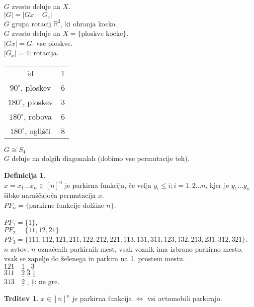 \documentclass[a4paper, 12pt]{book}
\theoremstyle{definition}
\newtheorem{defn}[counter]{Definicija}
\newtheorem{claim}[counter]{Trditev}
\theoremstyle{remark}
\newcommand{\R}{\mathbb{R}}
\begin{document}
$G$ zvesto deluje na $X$. \\
$|G| = |Gx| \cdot |G_x|$ \\
$G$ grupa rotacij $\R^3$, ki ohranja kocko. \\
$G$ zvesto deluje na $X = \{\text{ploskve kocke}\}$. \\
$|Gx| = G$: vse ploskve. \\
$|G_x| = 4$: rotacija. \\
\begin{center}
  \begin{tabular}{c | c}
    id & 1 \\
    $90^{\circ}$, ploskev & 6 \\
    $180^{\circ}$, ploskev & 3 \\
    $180^{\circ}$, robova & 6 \\
    $180^{\circ}$, oglišči & 8
  \end{tabular}
\end{center}
$G \cong S_4$ \\
$G$ deluje na dolgih diagonalah
(dobimo vse permutacije teh).
\begin{defn} \text{} \\
  $x = x_1 \dots x_n \in [n]^n$ je parkirna funkcija, če velja $y_i \leq i; i = 1, 2 \dots n$,
  kjer je $y_1 \dots y_n$ šibko naraščajoča permutacija $x$. \\
  $PF_n = \{\text{parkirne funkcije dolžine } n\}$.
\end{defn}
$PF_1 = \{1\}$, \\
$PF_2 = \{11, 12, 21\}$ \\
$PF_3 = \{111, 112, 121, 211, 122, 212, 221, 113, 131, 311, 123, 132, 213, 231, 312, 321\}$. \\
$n$ avtov, $n$ označenih parkirnih mest, vsak voznik ima izbrano parkirno mesto,
vsak se zapelje do želenega in parkira na 1. prostem mestu. \\
$121 \quad \underline{1} \; \_ \; \underline{3}$ \\
$311 \quad \underline{2} \; \underline{3} \; \underline{1}$ \\
$313 \quad \underline{2} \; \_ \; \underline{1}$: ne gre.
\begin{claim}
  $x \in [n]^n$ je parkirna funkcija $\iff$ vsi avtomobili parkirajo.
\end{claim}
\end{document}
